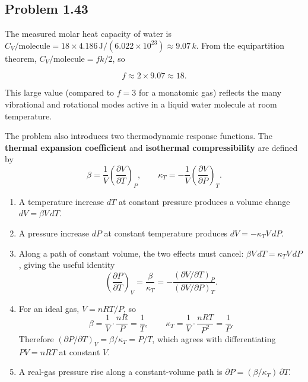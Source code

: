 \subsection*{Problem 1.43}

The measured molar heat capacity of water is $C_V/\text{molecule} = 18 \times 4.186\,\text{J} / (6.022 \times 10^{23}) \approx 9.07\,k$. From the equipartition theorem, $C_V/\text{molecule} = fk/2$, so

\[
    f \approx 2 \times 9.07 \approx 18.
\]

This large value (compared to $f=3$ for a monatomic gas) reflects the many vibrational and rotational modes active in a liquid water molecule at room temperature.

\medskip

The problem also introduces two thermodynamic response functions. The \textbf{thermal expansion coefficient} and \textbf{isothermal compressibility} are defined by
\[
    \beta = \frac{1}{V}\left(\frac{\partial V}{\partial T}\right)_{\!P}, \qquad
    \kappa_T = -\frac{1}{V}\left(\frac{\partial V}{\partial P}\right)_{\!T}.
\]

\begin{enumerate}[label=\alph*)]
    \item A temperature increase $dT$ at constant pressure produces a volume change $dV = \beta V\,dT$.

    \item A pressure increase $dP$ at constant temperature produces $dV = -\kappa_T V\,dP$.

    \item Along a path of constant volume, the two effects must cancel: $\beta V\,dT = \kappa_T V\,dP$, giving the useful identity
    \[
        \left(\frac{\partial P}{\partial T}\right)_{\!V} = \frac{\beta}{\kappa_T}
        = -\frac{(\partial V/\partial T)_P}{(\partial V/\partial P)_T}.
    \]

    \item For an ideal gas, $V = nRT/P$, so
    \[
        \beta = \frac{1}{V}\cdot\frac{nR}{P} = \frac{1}{T}, \qquad
        \kappa_T = \frac{1}{V}\cdot\frac{nRT}{P^2} = \frac{1}{P}.
    \]
    Therefore $(\partial P/\partial T)_V = \beta/\kappa_T = P/T$, which agrees with differentiating $PV = nRT$ at constant $V$. \checkmark

    \item A real-gas pressure rise along a constant-volume path is $\partial P = (\beta/\kappa_T)\,\partial T$.
\end{enumerate}

